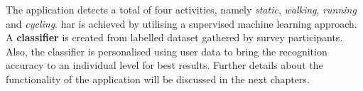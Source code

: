 The application detects a total of four activities, namely \textit{static}, \textit{walking}, \textit{running} and \textit{cycling}. \gls{har} is achieved by utilising a supervised machine learning approach. A \textbf{classifier} is created from labelled dataset gathered by survey participants. Also, the classifier is personalised using user data to bring the recognition accuracy to an individual level for best results. Further details about the functionality of the application will be discussed in the next chapters.  